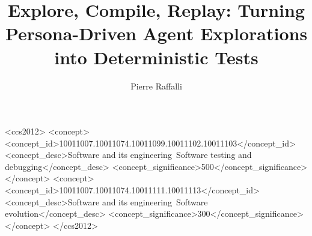 \documentclass[sigconf,review,anonymous]{acmart}
\begin{document}
\title{Explore, Compile, Replay: Turning Persona-Driven Agent Explorations into Deterministic Tests}

\author{Pierre Raffalli}




\begin{CCSXML}
<ccs2012>
 <concept>
  <concept_id>10011007.10011074.10011099.10011102.10011103</concept_id>
  <concept_desc>Software and its engineering~Software testing and debugging</concept_desc>
  <concept_significance>500</concept_significance>
 </concept>
 <concept>
  <concept_id>10011007.10011074.10011111.10011113</concept_id>
  <concept_desc>Software and its engineering~Software evolution</concept_desc>
  <concept_significance>300</concept_significance>
 </concept>
</ccs2012>
\end{CCSXML}


\maketitle















\end{document}
